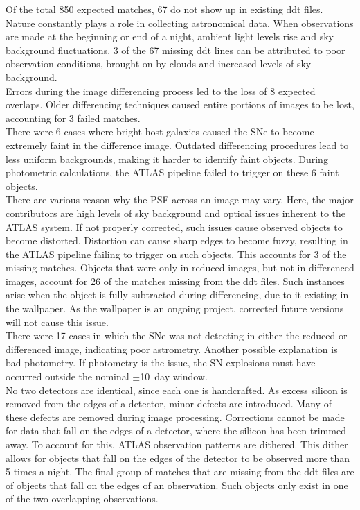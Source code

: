 \indent Of the total 850 expected matches, 67 do not show up in existing ddt files.  
Nature constantly plays a role in collecting astronomical data. When 
observations are made at the beginning or end of a night, ambient light 
levels rise and sky background fluctuations. 3 of the 67 missing ddt 
lines can be attributed to poor observation conditions, brought on by 
clouds and increased levels of sky background.\\
%
\indent Errors during the image differencing process led to the loss of 8 
expected overlaps. Older differencing techniques caused entire portions 
of images to be lost, accounting for 3 failed matches.\\
%
\indent There were 6 cases where bright host galaxies caused the SNe to become extremely 
faint in the difference image. Outdated differencing procedures lead to less 
uniform backgrounds, making it harder to identify faint objects.  
During photometric calculations, the ATLAS pipeline failed to trigger 
on these 6 faint objects.\\
%
\indent There are various reason why the PSF across an image may vary.  
Here, the major contributors are high levels of sky background and optical 
issues inherent to the ATLAS system.  
If not properly corrected, such issues cause observed objects to become distorted.  
Distortion can cause sharp edges to become fuzzy, resulting in the ATLAS pipeline 
failing to trigger on such objects. This accounts for 3 of the missing matches.  
Objects that were only in reduced images, but not in differenced images, account 
for 26 of the matches missing from the ddt files. Such instances arise when the 
object is fully subtracted during differencing, due to it existing in the wallpaper.  
As the wallpaper is an ongoing project, corrected future versions will not cause this issue.\\
%
\indent There were 17 cases in which the SNe was not detecting in either the reduced or 
differenced image, indicating poor astrometry. Another possible explanation is 
bad photometry. If photometry is the issue, the SN explosions must have occurred 
outside the nominal $\pm$10~day window.\\
%
\indent No two detectors are identical, since each one is handcrafted.  
As excess silicon is removed from the 
edges of a detector, minor defects are introduced.  Many of 
these defects are removed during image processing.  Corrections 
cannot be made for data that fall on the edges of a detector, 
where the silicon has been trimmed away.  To account for this, 
ATLAS observation patterns are dithered.  
This dither allows for objects that fall on the edges of the 
detector to be observed more than 5 times a night.  
The final group of matches that are missing from the ddt files 
are of objects that fall on the edges of an observation.  
Such objects only exist in one of the two overlapping observations.


